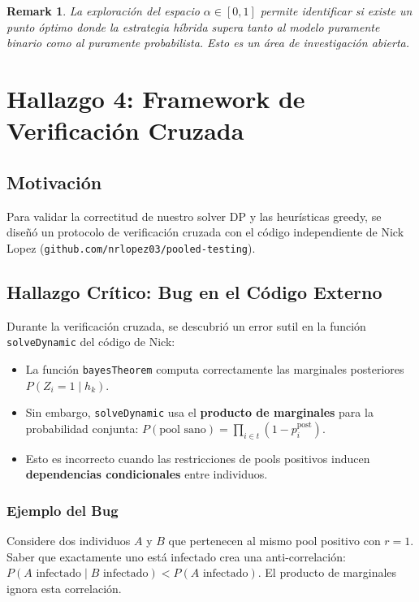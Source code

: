 \documentclass[11pt, a4paper]{article}
\newtheorem{remark}{Remark}
\begin{document}
\begin{remark}
La exploraci\'on del espacio $\alpha \in [0, 1]$ permite identificar si
existe un punto \'optimo donde la estrategia h\'ibrida supera tanto al
modelo puramente binario como al puramente probabilista. Esto es un
\'area de investigaci\'on abierta.
\end{remark}

\section{Hallazgo 4: Framework de Verificaci\'on Cruzada}
\label{sec:crossver}

\subsection{Motivaci\'on}
Para validar la correctitud de nuestro solver DP y las heur\'isticas
greedy, se dise\~n\'o un protocolo de verificaci\'on cruzada con el
c\'odigo independiente de Nick Lopez
(\texttt{github.com/nrlopez03/pooled-testing}).

\subsection{Hallazgo Cr\'itico: Bug en el C\'odigo Externo}
Durante la verificaci\'on cruzada, se descubri\'o un error sutil en la
funci\'on \texttt{solveDynamic} del c\'odigo de Nick:

\begin{itemize}[nosep]
    \item La funci\'on \texttt{bayesTheorem} computa correctamente las
    marginales posteriores $P(Z_i = 1 \mid h_k)$.
    \item Sin embargo, \texttt{solveDynamic} usa el \textbf{producto
    de marginales} para la probabilidad conjunta:
    $P(\text{pool sano}) = \prod_{i \in t} (1 - p_i^{\text{post}})$.
    \item Esto es incorrecto cuando las restricciones de pools positivos
    inducen \textbf{dependencias condicionales} entre individuos.
\end{itemize}

\subsubsection{Ejemplo del Bug}
Considere dos individuos $A$ y $B$ que pertenecen al mismo pool positivo
con $r = 1$. Saber que exactamente uno est\'a infectado crea una
anti-correlaci\'on: $P(A \text{ infectado} \mid B \text{ infectado}) <
P(A \text{ infectado})$. El producto de marginales ignora esta correlaci\'on.
\end{document}
